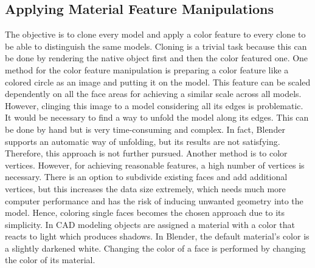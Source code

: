 \subsection{Applying Material Feature Manipulations}
\label{sec:dataset-material-feature}
The objective is to clone every model and apply a color feature to every clone to be able to distinguish the same models.
Cloning is a trivial task because this can be done by rendering the native object first and then the color featured one.
One method for the color feature manipulation is preparing a color feature like a colored circle as an image and putting it on the model.
This feature can be scaled dependently on all the face areas for achieving a similar scale across all models.
However, clinging this image to a model considering all its edges is problematic.
It would be necessary to find a way to unfold the model along its edges.
This can be done by hand but is very time-consuming and complex.
In fact, Blender supports an automatic way of unfolding, but its results are not satisfying.
Therefore, this approach is not further pursued.
Another method is to color vertices.
However, for achieving reasonable features, a high number of vertices is necessary.
There is an option to subdivide existing faces and add additional vertices, but this increases the data size extremely, which needs much more computer performance and has the risk of inducing unwanted geometry into the model.
Hence, coloring single faces becomes the chosen approach due to its simplicity.
In CAD modeling objects are assigned a material with a color that reacts to light which produces shadows.
In Blender, the default material's color is a slightly darkened white.
Changing the color of a face is performed by changing the color of its material.

